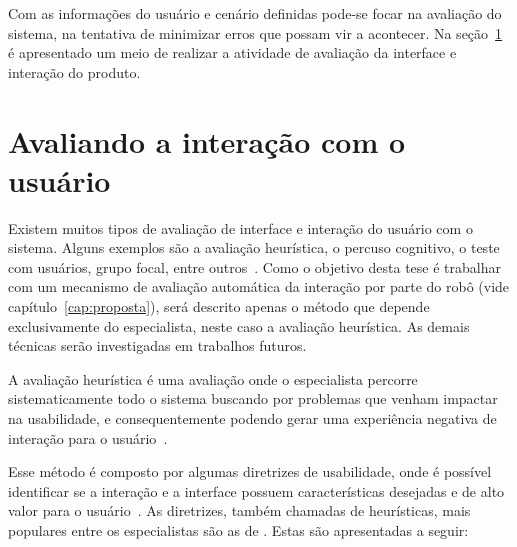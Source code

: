 Com as informações do usuário e cenário definidas pode-se focar na avaliação do sistema, na tentativa de minimizar erros que possam vir a acontecer. Na seção~\ref{sec:avaliacao} é apresentado um meio de realizar a atividade de avaliação da interface e interação do produto.

\section{Avaliando a interação com o usuário}
\label{sec:avaliacao}
Existem muitos tipos de avaliação de interface e interação do usuário com o sistema. Alguns exemplos são a avaliação heurística, o percuso cognitivo, o teste com usuários, grupo focal, entre outros~\cite{barbosa:2010}. Como o objetivo desta tese é trabalhar com um mecanismo de avaliação automática da interação por parte do robô (vide capítulo~\ref{cap:proposta}), será descrito apenas o método que depende exclusivamente do especialista, neste caso a avaliação heurística. As demais técnicas serão investigadas em trabalhos futuros.

A avaliação heurística é uma avaliação onde o especialista percorre sistematicamente todo o sistema buscando por problemas que venham impactar na usabilidade, e consequentemente podendo gerar uma experiência negativa de interação para o usuário~\cite{barbosa:2010, benyon:2011}.

Esse método é composto por algumas diretrizes de usabilidade, onde é possível identificar se a interação e a interface possuem características desejadas e de alto valor para o usuário~\cite{barbosa:2010, benyon:2011}. As diretrizes, também chamadas de heurísticas, mais populares entre os especialistas são as de . Estas são apresentadas a seguir:

